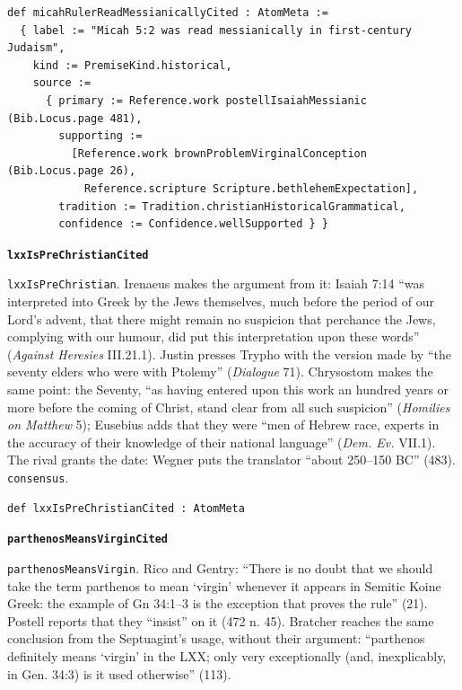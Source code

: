 \documentclass[11pt]{article}
\begin{document}
{\small\begin{verbatim}
def micahRulerReadMessianicallyCited : AtomMeta :=
  { label := "Micah 5:2 was read messianically in first-century Judaism",
    kind := PremiseKind.historical,
    source :=
      { primary := Reference.work postellIsaiahMessianic (Bib.Locus.page 481),
        supporting :=
          [Reference.work brownProblemVirginalConception (Bib.Locus.page 26),
            Reference.scripture Scripture.bethlehemExpectation],
        tradition := Tradition.christianHistoricalGrammatical,
        confidence := Confidence.wellSupported } }
\end{verbatim}}
\par\medskip\noindent\textbf{\texttt{lxx\allowbreak{}Is\allowbreak{}Pre\allowbreak{}Christian\allowbreak{}Cited}}\par\nobreak\noindent
\texttt{lxx\allowbreak{}Is\allowbreak{}Pre\allowbreak{}Christian}. Irenaeus makes the argument from it: Isaiah 7:14 “was interpreted into Greek by the Jews themselves, much before the period of our Lord’s advent, that there might remain no suspicion that perchance the Jews, complying with our humour, did put this interpretation upon these words” (\emph{Against Heresies} III.21.1). Justin presses Trypho with the version made by “the seventy elders who were with Ptolemy” (\emph{Dialogue} 71). Chrysostom makes the same point: the Seventy, “as having entered upon this work an hundred years or more before the coming of Christ, stand clear from all such suspicion” (\emph{Homilies on Matthew} 5); Eusebius adds that they were “men of Hebrew race, experts in the accuracy of their knowledge of their national language” (\emph{Dem. Ev.} VII.1). The rival grants the date: Wegner puts the translator “about 250–150 BC” (483). \texttt{consensus}.

{\small\begin{verbatim}
def lxxIsPreChristianCited : AtomMeta
\end{verbatim}}
\par\medskip\noindent\textbf{\texttt{parthenos\allowbreak{}Means\allowbreak{}Virgin\allowbreak{}Cited}}\par\nobreak\noindent
\texttt{parthenos\allowbreak{}Means\allowbreak{}Virgin}. Rico and Gentry: “There is no doubt that we should take the term parthenos to mean ‘virgin’ whenever it appears in Semitic Koine Greek: the example of Gn 34:1–3 is the exception that proves the rule” (21). Postell reports that they “insist” on it (472 n. 45). Bratcher reaches the same conclusion from the Septuagint’s usage, without their argument: “parthenos definitely means ‘virgin’ in the LXX; only very exceptionally (and, inexplicably, in Gen. 34:3) is it used otherwise” (113).
\end{document}
